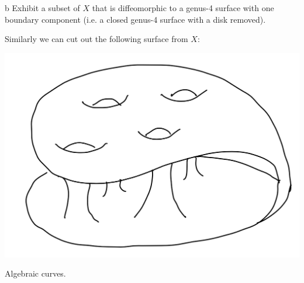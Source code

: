 \documentclass{pset}
\begin{document}
\begin{solution}
  \begin{part}{b}
    Exhibit a subset of $X$ that is diffeomorphic to a genus-4 surface with one boundary component (i.e. a closed genus-4 surface with a disk removed).
  \end{part}

  Similarly we can cut out the following surface from $X$:
  \begin{center}
    \includegraphics[scale=0.5]{figure3.png}
  \end{center}
\end{solution}

\begin{problem}{3}
  Algebraic curves.
\end{problem}
\end{document}

